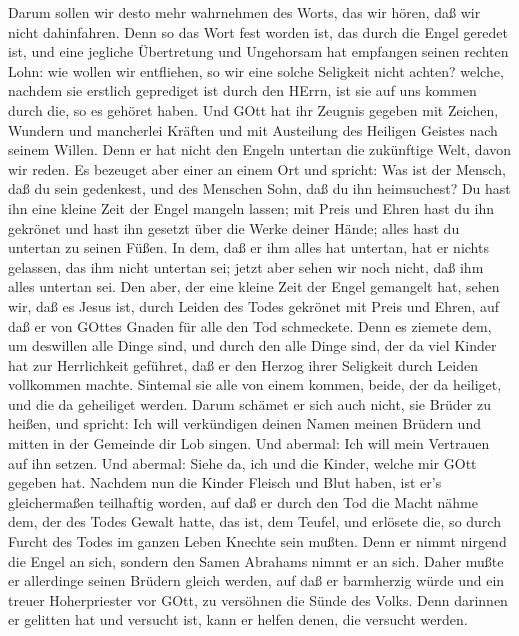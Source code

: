  Darum sollen wir desto mehr wahrnehmen des Worts, das wir
hören, daß wir nicht dahinfahren.  Denn so das Wort fest
worden ist, das durch die Engel geredet ist, und eine jegliche
Übertretung und Ungehorsam hat empfangen seinen rechten Lohn:
 wie wollen wir entfliehen, so wir eine solche Seligkeit
nicht achten? welche, nachdem sie erstlich geprediget ist durch den
HErrn, ist sie auf uns kommen durch die, so es gehöret haben.
 Und GOtt hat ihr Zeugnis gegeben mit Zeichen, Wundern und
mancherlei Kräften und mit Austeilung des Heiligen Geistes nach seinem
Willen.  Denn er hat nicht den Engeln untertan die
zukünftige Welt, davon wir reden.  Es bezeuget aber einer an
einem Ort und spricht: Was ist der Mensch, daß du sein gedenkest, und
des Menschen Sohn, daß du ihn heimsuchest?  Du hast ihn eine
kleine Zeit der Engel mangeln lassen; mit Preis und Ehren hast du ihn
gekrönet und hast ihn gesetzt über die Werke deiner Hände; 
alles hast du untertan zu seinen Füßen. In dem, daß er ihm alles hat
untertan, hat er nichts gelassen, das ihm nicht untertan sei; jetzt aber
sehen wir noch nicht, daß ihm alles untertan sei.  Den aber,
der eine kleine Zeit der Engel gemangelt hat, sehen wir, daß es Jesus
ist, durch Leiden des Todes gekrönet mit Preis und Ehren, auf daß er von
GOttes Gnaden für alle den Tod schmeckete.  Denn es ziemete
dem, um deswillen alle Dinge sind, und durch den alle Dinge sind, der da
viel Kinder hat zur Herrlichkeit geführet, daß er den Herzog ihrer
Seligkeit durch Leiden vollkommen machte.  Sintemal sie
alle von einem kommen, beide, der da heiliget, und die da geheiliget
werden. Darum schämet er sich auch nicht, sie Brüder zu heißen,
 und spricht: Ich will verkündigen deinen Namen meinen
Brüdern und mitten in der Gemeinde dir Lob singen.  Und
abermal: Ich will mein Vertrauen auf ihn setzen. Und abermal: Siehe da,
ich und die Kinder, welche mir GOtt gegeben hat.  Nachdem
nun die Kinder Fleisch und Blut haben, ist er's gleichermaßen teilhaftig
worden, auf daß er durch den Tod die Macht nähme dem, der des Todes
Gewalt hatte, das ist, dem Teufel,  und erlösete die, so
durch Furcht des Todes im ganzen Leben Knechte sein mußten.
 Denn er nimmt nirgend die Engel an sich, sondern den Samen
Abrahams nimmt er an sich.  Daher mußte er allerdinge
seinen Brüdern gleich werden, auf daß er barmherzig würde und ein treuer
Hoherpriester vor GOtt, zu versöhnen die Sünde des Volks. 
Denn darinnen er gelitten hat und versucht ist, kann er helfen denen,
die versucht werden.

